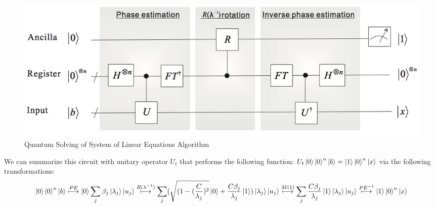 \documentclass[11pt]{journal}
\begin{document}
\begin{figure}[H]
    \centering
    \includegraphics[scale = 0.6]{1.png}
    \caption{Quantum Solving of System of Linear Equations Algorithm}
    \label{fig:my_label}
\end{figure}
We can summarize this circuit with unitary operator $U_t$ that performs the following function: $U_t\ket{0}\ket{0}^n\ket{b} = \ket{1}\ket{0}^n\ket{x}$ via the following transformations:
 \[\ket{0}\ket{0}^n\ket{b} \overset{PE}{\longmapsto} \ket{0} \sum_j \beta_j \ket{\lambda_j} \ket{u_j} \overset{R(\lambda^{-1})}{\longmapsto} \sum_j (\sqrt{(1-(\frac{C}{\lambda_j})^2}\ket{0} + \frac{C\beta_j}{\lambda_j} \ket{1}) \ket{\lambda_j} \ket{u_j} \overset{M(1)}{\longmapsto} \sum_j  \frac{C\beta_j}{\lambda_j} \ket{1} \ket{\lambda_j} \ket{u_j} \overset{PE^{-1}}{\longmapsto} \ket{1}\ket{0}^n\ket{x}\]
\end{document}

